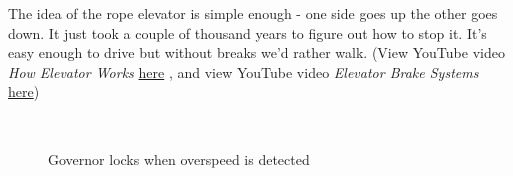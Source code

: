 	The idea of the rope elevator is simple
	enough - one side goes up the other goes
	down. It just took a couple of thousand
	years to figure out how to stop it.
	It's easy enough to drive but without
	breaks we'd rather walk. (View YouTube
	video \textit{How Elevator Works}
	\href{https://markjohntaylor.com/blog/wordpress/index.php/2020/06/15/the-elevator#principle}
	{here}
	, and view YouTube video \textit{Elevator Brake Systems} 
	\href{https://markjohntaylor.com/blog/wordpress/index.php/2020/06/15/the-elevator#brake}{here})
	
	\begin{figure}
		\\
		\caption{Governor locks when overspeed is detected}
		\label{governor}
	\end{figure}
	
	\clearpage
	